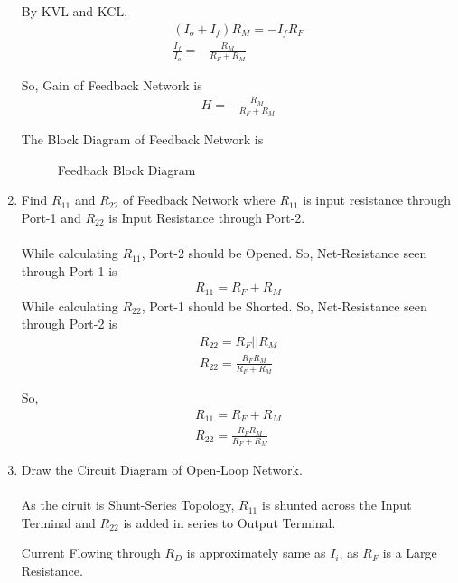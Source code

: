 \begin{enumerate}[label=\thesubsection.\arabic*.,ref=\thesubsection.\theenumi]
By KVL and KCL,
\begin{align}
(I_{o} + I_{f})R_{M} = -I_{f}R_{F}\\
\frac{I_{f}}{I_{o}} = -\frac{R_{M}}{R_{F}+R_{M}}
\end{align}

So, Gain of Feedback Network is
\begin{align}
H = -\frac{R_{M}}{R_{F}+R_{M}}
\end{align}

The Block Diagram of Feedback Network is
\begin{figure}[ht!]
	\begin{center}
		\resizebox{\columnwidth}{!}{}
	\end{center}
	\caption{Feedback Block Diagram}
	\label{fig:Feedback_Block}
\end{figure}

\item Find $R_{11}$ and $R_{22}$  of Feedback Network where $R_{11}$ is input resistance through Port-1 and $R_{22}$ is Input Resistance through Port-2.\\
\solution\\
While calculating $R_{11}$, Port-2 should be Opened. So, Net-Resistance seen through Port-1 is 
\begin{align}
R_{11} = R_{F} + R_{M}
\end{align}
While calculating $R_{22}$, Port-1 should be Shorted. So, Net-Resistance seen through Port-2 is 
\begin{align}
R_{22} = R_{F} || R_{M}\\
R_{22} = \frac{R_{F}R_{M}}{R_{F}+R_{M}}
\end{align}

So,
\begin{align}
R_{11} = R_{F} + R_{M}\\
R_{22} = \frac{R_{F}R_{M}}{R_{F}+R_{M}}
\end{align}

\item Draw the Circuit Diagram of Open-Loop Network.\\
\solution\\
As the ciruit is Shunt-Series Topology, $R_{11}$ is shunted across the Input Terminal and $R_{22}$ is added in series to Output Terminal.

Current Flowing through $R_{D}$ is approximately same as $I_{i}$, as $R_{F}$ is a Large Resistance.


\end{enumerate}
